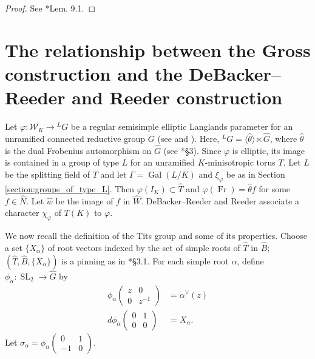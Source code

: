 \documentclass{amsart}
\theoremstyle{plain}
\theoremstyle{definition}
\numberwithin{equation}{section}
\DeclareMathOperator{\Gal}{Gal}
\DeclareMathOperator{\Fr}{Fr}
\DeclareMathOperator{\SL}{SL}
\newcommand{\Weil}{\mathcal{W}}
\begin{document}
\begin{proof}
See \cite{adrian-lansky:ppa}*{Lem. 9.1}.
\end{proof}

\section{The relationship between the Gross construction and the DeBacker--Reeder and Reeder construction}
\label{section:gross_debacker_reeder}

Let $\varphi : \Weil_K \rightarrow {}^L G$ be a regular semisimple elliptic Langlands
parameter for an unramified connected reductive group $G$
(see \cite{reeder-debacker:09a} and \cite{reeder:08a}).
Here, ${}^L G = \langle \hat{\theta} \rangle \ltimes \hat{G}$,
where $\hat{\theta}$ is the dual Frobenius automorphism on $\hat{G}$
(see \cite{reeder-debacker:09a}*{\S 3}).
Since $\varphi$ is elliptic, its image is contained in a group of type $L$ for an unramified $K$-minisotropic torus $T$.
Let $L$ be the splitting field of $T$ and let $\Gamma = \Gal(L/K)$ and $\xi_\varphi$ be as in Section \ref{section:groups_of_type_L}.
Then $\varphi(I_K) \subset \hat{T}$ and
$\varphi(\Fr) = \hat{\theta} f$ for some $f \in \hat{N}$.  Let $\hat{w}$
be the image of $f$ in $\hat{W}$.
DeBacker--Reeder \cite{reeder-debacker:09a} and Reeder \cite{reeder:08a}
associate a character $\chi_{\varphi}$ of $T(K)$ to $\varphi$.

We now recall the definition of
the Tits group and some of its properties.  Choose a set $\{ X_{\alpha} \}$ of root vectors
indexed by the set of simple roots of $\hat{T}$ in $\hat{B}$; $(\hat{T}, \hat{B}, \{X_{\alpha} \})$
is a pinning as in \cite{reeder:10a}*{\S 3.1}.
For each simple root $\alpha$, define $\phi_{\alpha} : \SL_2 \rightarrow \hat{G}$
by
\begin{align*}
\phi_{\alpha}\begin{pmatrix}z & 0 \\ 0 & z^{-1}\end{pmatrix} &= \alpha^{\vee}(z) \\
d \phi_{\alpha}\begin{pmatrix}0 & 1 \\ 0 & 0\end{pmatrix} &= X_{\alpha}.
\end{align*}
Let $\sigma_{\alpha} = \phi_{\alpha}\begin{pmatrix}0 & 1 \\ -1 & 0\end{pmatrix}$.
\end{document}

